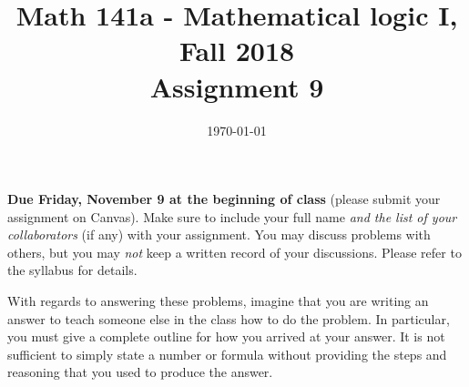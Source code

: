 \documentclass{amsart}
\title[Math 141a, Fall 2018: assignment 9]{Math 141a - Mathematical logic I, Fall 2018 \\ Assignment 9}
\date{\today}
\theoremstyle{definition}
\begin{document}

\maketitle

\textbf{Due Friday, November 9 at the beginning of class} (please submit your assignment on Canvas). Make sure to include your full name \emph{and the list of your collaborators} (if any) with your assignment. You may discuss problems with others, but you may \emph{not} keep a written record of your discussions. Please refer to the syllabus for details.

With regards to answering these problems, imagine that you are writing an answer to teach someone else in the class how to do the problem. In particular, you must give a complete outline for how you arrived at your answer. It is not sufficient to simply state a number or formula without providing the steps and reasoning that you used to produce the answer.
\end{document}
